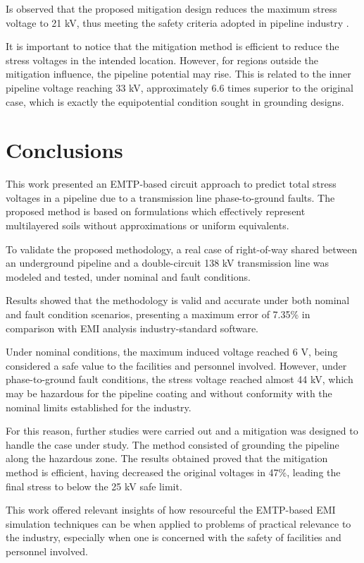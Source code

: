 \documentclass{IEEEtran4PSCC}
\begin{document}
Is observed that the proposed mitigation design reduces the maximum stress voltage to 21 kV, thus meeting the safety criteria adopted in pipeline industry \cite{NACEInternational2007}. 

It is important to notice that the mitigation method is efficient to reduce the stress voltages in the intended location. However, for regions outside the mitigation influence, the pipeline potential may rise. This is related to the inner pipeline voltage reaching 33 kV, approximately 6.6 times superior to the original case, which is exactly the equipotential condition sought in grounding designs.

\section{Conclusions}

This work presented an EMTP-based circuit approach to predict total stress voltages in a pipeline due to a transmission line phase-to-ground faults. The proposed method is based on formulations which effectively represent multilayered soils without approximations or uniform equivalents. 

To validate the proposed methodology, a real case of right-of-way shared between an underground pipeline and a double-circuit 138 kV transmission line was modeled and tested, under nominal and fault conditions. 

Results showed that the methodology is valid and accurate under both nominal and fault condition scenarios, presenting a maximum error of 7.35\% in comparison with  EMI analysis industry-standard software.

Under nominal conditions, the maximum induced voltage reached 6 V, being considered a safe value to the facilities and personnel involved. However, under phase-to-ground fault conditions, the stress voltage reached almost 44 kV, which may be hazardous for the pipeline coating and without conformity with the nominal limits established for the industry. 

For this reason, further studies were carried out and a mitigation was designed to handle the case under study. The method consisted of grounding the pipeline along the hazardous zone. The results obtained proved that the mitigation method is efficient, having decreased  the original voltages in 47\%, leading the final stress to below the 25 kV safe limit. 

This work offered relevant insights of how resourceful the EMTP-based EMI simulation techniques can be when applied to problems of practical relevance to the industry, especially when one is concerned with the safety of facilities and personnel involved.
\end{document}
